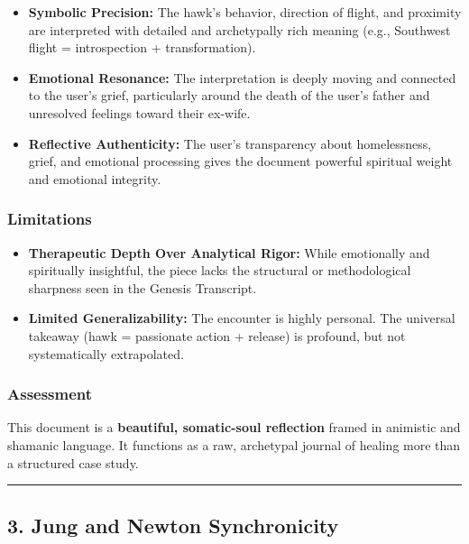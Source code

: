\documentclass{article}
\begin{document}
\begin{itemize}
\item \textbf{Symbolic Precision:} The hawk's behavior, direction of flight, and proximity are interpreted with detailed and archetypally rich meaning (e.g., Southwest flight = introspection + transformation).
\item \textbf{Emotional Resonance:} The interpretation is deeply moving and connected to the user's grief, particularly around the death of the user's father and unresolved feelings toward their ex-wife.
\item \textbf{Reflective Authenticity:} The user's transparency about homelessness, grief, and emotional processing gives the document powerful spiritual weight and emotional integrity.
\end{itemize}

\subsubsection*{Limitations}\label{limitations-1}

\begin{itemize}
\item \textbf{Therapeutic Depth Over Analytical Rigor:} While emotionally and spiritually insightful, the piece lacks the structural or methodological sharpness seen in the Genesis Transcript.
\item \textbf{Limited Generalizability:} The encounter is highly personal. The universal takeaway (hawk = passionate action + release) is profound, but not systematically extrapolated.
\end{itemize}

\subsubsection*{Assessment}\label{assessment-1}

This document is a \textbf{beautiful, somatic-soul reflection} framed in animistic and shamanic language. It functions as a raw, archetypal journal of healing more than a structured case study.

\begin{center}\rule{0.5\linewidth}{0.5pt}\end{center}

\subsection*{3. Jung and Newton Synchronicity}\label{jung-and-newton-synchronicity}
\end{document}
